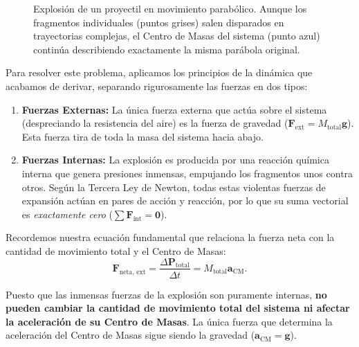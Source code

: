 \documentclass[11pt,a4paper]{book}
\begin{document}
\begin{figure}[htbp]
\caption{Explosión de un proyectil en movimiento parabólico. Aunque los fragmentos individuales (puntos grises) salen disparados en trayectorias complejas, el Centro de Masas del sistema (punto azul) continúa describiendo exactamente la misma parábola original.}
\label{fig:explosion_granada}
\end{figure}

Para resolver este problema, aplicamos los principios de la dinámica que acabamos de derivar, separando rigurosamente las fuerzas en dos tipos:

\begin{enumerate}
    \item \textbf{Fuerzas Externas:} La única fuerza externa que actúa sobre el sistema (despreciando la resistencia del aire) es la fuerza de gravedad ($\boldsymbol{F}_{\text{ext}} = M_{\text{total}} \boldsymbol{g}$). Esta fuerza tira de toda la masa del sistema hacia abajo.
    \item \textbf{Fuerzas Internas:} La explosión es producida por una reacción química interna que genera presiones inmensas, empujando los fragmentos unos contra otros. Según la Tercera Ley de Newton, todas estas violentas fuerzas de expansión actúan en pares de acción y reacción, por lo que su suma vectorial es \textit{exactamente cero} ($\sum \boldsymbol{F}_{\text{int}} = \boldsymbol{0}$).
\end{enumerate}

Recordemos nuestra ecuación fundamental que relaciona la fuerza neta con la cantidad de movimiento total y el Centro de Masas:
\begin{equation}
    \boldsymbol{F}_{\text{neta, ext}} = \frac{\Delta \boldsymbol{P}_{\text{total}}}{\Delta t} = M_{\text{total}} \boldsymbol{a}_{\text{CM}}.
\end{equation}

Puesto que las inmensas fuerzas de la explosión son puramente internas, \textbf{no pueden cambiar la cantidad de movimiento total del sistema ni afectar la aceleración de su Centro de Masas}. La única fuerza que determina la aceleración del Centro de Masas sigue siendo la gravedad ($\boldsymbol{a}_{\text{CM}} = \boldsymbol{g}$).
\end{document}
